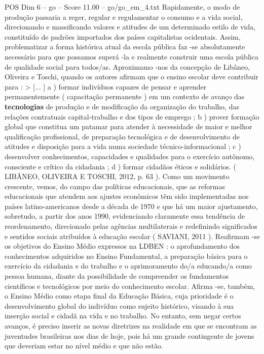 \begin{textsample}{POS Dim 6 – go – Score 11.00 – go/go\_em\_4.txt}
Rapidamente, o modo de produção passaria a reger, regular e regulamentar o consumo e a vida social, direcionando e massificando valores e atitudes de um determinado estilo de vida, constituído de padrões importados dos países capitalistas ocidentais.
Assim, problematizar a forma histórica atual da escola pública faz -se absolutamente necessário para que possamos superá -la e realmente construir uma escola pública de qualidade social para todos/as.
Aproximamo -nos da concepção de Libâneo, Oliveira e Toschi, quando os autores afirmam que o ensino escolar deve contribuir para : > [... ] a ) formar indivíduos capazes de pensar e aprender permanentemente ( capacitação permanente ) em um contexto de avanço das \textbf{tecnologias} de produção e de modificação da organização do trabalho, das relações contratuais capital-trabalho e dos tipos de emprego ; b ) prover formação global que constitua um patamar para atender à necessidade de maior e melhor qualificação profissional, de preparação tecnológica e de desenvolvimento de atitudes e disposição para a vida numa sociedade técnico-informacional ; c ) desenvolver conhecimentos, capacidades e qualidades para o exercício autônomo, consciente e crítico da cidadania ; d ) formar cidadãos éticos e solidários. ( LIBÂNEO, OLIVEIRA E TOSCHI, 2012, p. 63 ).
Como um movimento crescente, vemos, do campo das políticas educacionais, que as reformas educacionais que atendem aos ajustes econômicos têm sido implementadas nos países latino-americanos desde a década de 1970 e que há um maior ajustamento, sobretudo, a partir dos anos 1990, evidenciando claramente essa tendência de reordenamento, direcionado pelas agências multilaterais e redefinindo significados e sentidos sociais atribuídos à educação escolar ( SAVIANI, 2011 ).
Reafirmam -se os objetivos do Ensino Médio expressos na LDBEN : o aprofundamento dos conhecimentos adquiridos no Ensino Fundamental, a preparação básica para o exercício da cidadania e do trabalho e o aprimoramento do/a educando/a como pessoa humana, diante da possibilidade de compreender os fundamentos científicos e tecnológicos por meio do conhecimento escolar.
Afirma -se, também, o Ensino Médio como etapa final da Educação Básica, cuja prioridade é o desenvolvimento global do indivíduo como sujeito histórico, visando à sua inserção social e cidadã na vida e no trabalho.
No entanto, sem negar certos avanços, é preciso inserir as novas diretrizes na realidade em que se encontram as juventudes brasileiras nos dias de hoje, pois há um grande contingente de jovens que deveriam estar no nível médio e que não estão.

\end{textsample}
